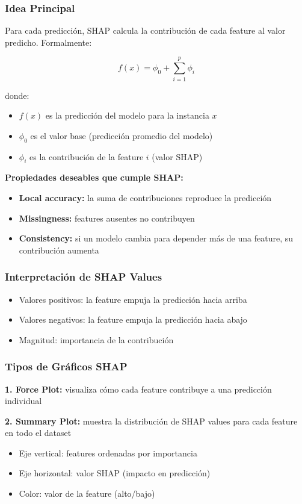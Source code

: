 \documentclass[11pt,a4paper]{article}
\begin{document}
\subsubsection{Idea Principal}

Para cada predicción, SHAP calcula la contribución de cada feature al valor predicho. Formalmente:

$$f(x) = \phi_0 + \sum_{i=1}^{p} \phi_i$$

donde:
\begin{itemize}
\item $f(x)$ es la predicción del modelo para la instancia $x$
\item $\phi_0$ es el valor base (predicción promedio del modelo)
\item $\phi_i$ es la contribución de la feature $i$ (valor SHAP)
\end{itemize}

\textbf{Propiedades deseables que cumple SHAP:}
\begin{itemize}
\item \textbf{Local accuracy:} la suma de contribuciones reproduce la predicción
\item \textbf{Missingness:} features ausentes no contribuyen
\item \textbf{Consistency:} si un modelo cambia para depender más de una feature, su contribución aumenta
\end{itemize}

\subsubsection{Interpretación de SHAP Values}

\begin{itemize}
\item Valores positivos: la feature empuja la predicción hacia arriba
\item Valores negativos: la feature empuja la predicción hacia abajo
\item Magnitud: importancia de la contribución
\end{itemize}

\subsubsection{Tipos de Gráficos SHAP}

\textbf{1. Force Plot:} visualiza cómo cada feature contribuye a una predicción individual

\textbf{2. Summary Plot:} muestra la distribución de SHAP values para cada feature en todo el dataset
\begin{itemize}
\item Eje vertical: features ordenadas por importancia
\item Eje horizontal: valor SHAP (impacto en predicción)
\item Color: valor de la feature (alto/bajo)
\end{itemize}
\end{document}
